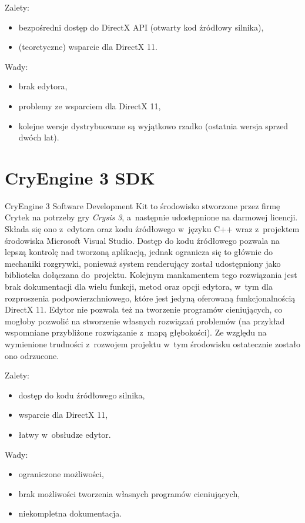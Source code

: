 {\raggedright Zalety:
\begin{itemize}
\item bezpośredni dostęp do DirectX API (otwarty kod źródłowy silnika),
\item (teoretyczne) wsparcie dla DirectX 11.
\end{itemize}

Wady:
\begin{itemize}
\item brak edytora,
\item problemy ze wsparciem dla DirectX 11,
\item kolejne wersje dystrybuowane są wyjątkowo rzadko (ostatnia wersja sprzed dwóch lat).
\end{itemize}
}
\section{CryEngine 3 SDK}

CryEngine 3 Software Development Kit to środowisko stworzone przez firmę Crytek na potrzeby gry \emph{Crysis 3}, a~następnie udostępnione na darmowej licencji. Składa się ono z~edytora oraz kodu źródłowego w~języku C++ wraz z~projektem środowiska Microsoft Visual Studio. Dostęp do kodu źródłowego pozwala na lepszą kontrolę nad tworzoną aplikacją, jednak ogranicza się to głównie do mechaniki rozgrywki, ponieważ system renderujący został udostępniony jako biblioteka dołączana do~projektu. Kolejnym mankamentem tego rozwiązania jest brak dokumentacji dla wielu funkcji, metod oraz opcji edytora, w~tym dla rozproszenia podpowierzchniowego, które jest jedyną oferowaną funkcjonalnością DirectX 11. Edytor nie pozwala też na tworzenie programów cieniujących, co mogłoby pozwolić na stworzenie własnych rozwiązań problemów (na przykład wspomniane przybliżone rozwiązanie z~mapą głębokości). Ze względu na wymienione trudności z~rozwojem projektu w~tym środowisku ostatecznie zostało ono odrzucone.\\

{\raggedright Zalety:
\begin{itemize}
\item dostęp do kodu źródłowego silnika,
\item wsparcie dla DirectX 11,
\item łatwy w~obsłudze edytor.
\end{itemize}

Wady:
\begin{itemize}
\item ograniczone możliwości,
\item brak możliwości tworzenia własnych programów cieniujących,
\item niekompletna dokumentacja.
\end{itemize}
}

